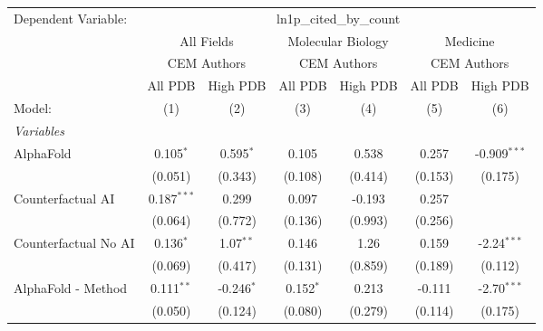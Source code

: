 \begingroup
\centering
\begin{tabular}{lcccccc}
   \tabularnewline \midrule \midrule
   Dependent Variable: & \multicolumn{6}{c}{ln1p\_cited\_by\_count}\\
 & \multicolumn{2}{c}{All Fields} & \multicolumn{2}{c}{Molecular Biology} & \multicolumn{2}{c}{Medicine} \\
\cmidrule(lr){2-3} \cmidrule(lr){4-5} \cmidrule(lr){6-7}
 & \multicolumn{2}{c}{CEM Authors} & \multicolumn{2}{c}{CEM Authors} & \multicolumn{2}{c}{CEM Authors} \\
\cmidrule(lr){2-3} \cmidrule(lr){4-5} \cmidrule(lr){6-7}
 & \multicolumn{1}{c}{All PDB} & \multicolumn{1}{c}{High PDB} & \multicolumn{1}{c}{All PDB} & \multicolumn{1}{c}{High PDB} & \multicolumn{1}{c}{All PDB} & \multicolumn{1}{c}{High PDB} \\
\cmidrule(lr){2-2} \cmidrule(lr){3-3} \cmidrule(lr){4-4} \cmidrule(lr){5-5} \cmidrule(lr){6-6} \cmidrule(lr){7-7}
   Model:                                                     & (1)           & (2)          & (3)           & (4)     & (5)            & (6)\\  
   \midrule
   \emph{Variables}\\
   AlphaFold                                                  & 0.105$^{*}$   & 0.595$^{*}$  & 0.105         & 0.538   & 0.257          & -0.909$^{***}$\\   
                                                              & (0.051)       & (0.343)      & (0.108)       & (0.414) & (0.153)        & (0.175)\\   
   Counterfactual AI                                          & 0.187$^{***}$ & 0.299        & 0.097         & -0.193  & 0.257          &   \\   
                                                              & (0.064)       & (0.772)      & (0.136)       & (0.993) & (0.256)        &   \\   
   Counterfactual No AI                                       & 0.136$^{*}$   & 1.07$^{**}$  & 0.146         & 1.26    & 0.159          & -2.24$^{***}$\\   
                                                              & (0.069)       & (0.417)      & (0.131)       & (0.859) & (0.189)        & (0.112)\\   
   AlphaFold - Method                                         & 0.111$^{**}$  & -0.246$^{*}$ & 0.152$^{*}$   & 0.213   & -0.111         & -2.70$^{***}$\\   
                                                              & (0.050)       & (0.124)      & (0.080)       & (0.279) & (0.114)        & (0.175)\\   

\end{tabular}
